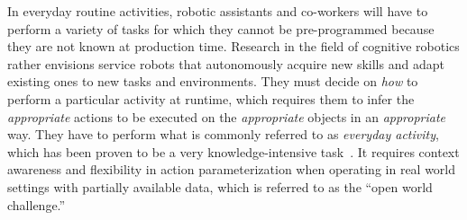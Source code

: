 \documentclass[oribibl]{llncs}
\begin{document}
In everyday routine activities, robotic assistants and co-workers 
will have to perform a variety of tasks for which they cannot be 
pre-programmed because they are not known at production time. 
Research in the field of cognitive robotics rather envisions service 
robots that autonomously acquire new skills and adapt existing ones 
to new tasks and environments. They must decide on \textit{how} to 
perform a particular activity at runtime, which requires them to infer 
the \textit{appropriate} actions to be executed on the \textit 
{appropriate} objects in an \textit{appropriate} way. They have to 
perform what is commonly referred to as \textit{everyday activity}, 
which has been proven to be a very knowledge-intensive task~\cite 
{anderson95phd, nyga12actioncore}. It requires context awareness and 
flexibility in action parameterization when operating in real world 
settings with partially available data, which is referred to as the 
``open world challenge.'' 
\end{document}
